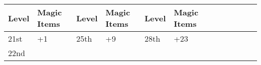 \vspace{12pt}
\begin{longtable}{llllllllllll}
\hline
\multicolumn{1}{|p{0.474in}|}{\begin{minipage}[t]{0.474in}\centering
\textbf{Level}\end{minipage}} & \multicolumn{1}{p{0.887in}|}{\begin{minipage}[t]{0.887in}\raggedright
\textbf{Magic Items}\end{minipage}} & \multicolumn{1}{p{0.474in}|}{\begin{minipage}[t]{0.474in}\raggedright
\textbf{Level}\end{minipage}} & \multicolumn{1}{p{0.887in}|}{\begin{minipage}[t]{0.887in}\raggedright
\textbf{Magic Items}\end{minipage}} & \multicolumn{1}{p{0.474in}|}{\begin{minipage}[t]{0.474in}\raggedright
\textbf{Level}\end{minipage}} & \multicolumn{1}{p{0.887in}|}{\begin{minipage}[t]{0.887in}\raggedright
\textbf{Magic Items}\end{minipage}}\\
\hline
\multicolumn{1}{p{0.069in}|}{\begin{minipage}[t]{0.069in}\centering
21st\end{minipage}} & \multicolumn{1}{p{0.069in}|}{\begin{minipage}[t]{0.069in}\raggedright
+1\end{minipage}} & \multicolumn{1}{p{0.069in}|}{\begin{minipage}[t]{0.069in}\raggedright
25th\end{minipage}} & \multicolumn{1}{p{0.069in}|}{\begin{minipage}[t]{0.069in}\raggedright
+9\end{minipage}} & \multicolumn{1}{p{0.069in}|}{\begin{minipage}[t]{0.069in}\raggedright
28th\end{minipage}} & \multicolumn{1}{p{0.069in}|}{\begin{minipage}[t]{0.069in}\raggedright
+23\end{minipage}}\\
\hline
\multicolumn{1}{|p{0.474in}|}{\begin{minipage}[t]{0.474in}\centering
22nd\end{minipage}} & \multicolumn{1}{p{0.887in}|}{\begin{minipage}[t]{0.887in}\raggedright

\end{minipage}}
\end{longtable}
